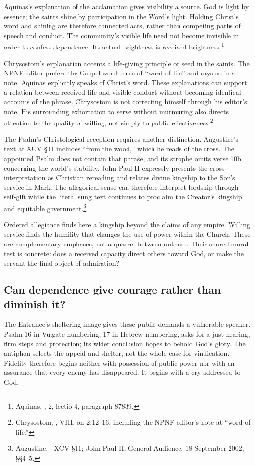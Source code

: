 Aquinas's explanation of the acclamation gives visibility a source. God is light by essence; the saints shine by participation in the Word's light. Holding Christ's word and shining are therefore connected acts, rather than competing paths of speech and conduct. The community's visible life need not become invisible in order to confess dependence. Its actual brightness is received brightness.\footnote{Aquinas, , 2, lectio 4, paragraph 87839.}

Chrysostom's explanation accents a life-giving principle or seed in the saints. The NPNF editor prefers the Gospel-word sense of ``word of life'' and says so in a note. Aquinas explicitly speaks of Christ's word. These explanations can support a relation between received life and visible conduct without becoming identical accounts of the phrase. Chrysostom is not correcting himself through his editor's note. His surrounding exhortation to serve without murmuring also directs attention to the quality of willing, not simply to public effectiveness.\footnote{Chrysostom, , VIII, on 2:12--16, including the NPNF editor's note at ``word of life.''}

The Psalm's Christological reception requires another distinction. Augustine's text at XCV §11 includes ``from the wood,'' which he reads of the cross. The appointed Psalm does not contain that phrase, and its strophe omits verse 10b concerning the world's stability. John Paul II expressly presents the cross interpretation as Christian rereading and relates divine kingship to the Son's service in Mark. The allegorical sense can therefore interpret lordship through self-gift while the literal sung text continues to proclaim the Creator's kingship and equitable government.\footnote{Augustine, , XCV §11; John Paul II, General Audience, 18 September 2002, §§4--5.}

Ordered allegiance finds here a kingship beyond the claims of any empire. Willing service finds the humility that changes the use of power within the Church. These are complementary emphases, not a quarrel between authors. Their shared moral test is concrete: does a received capacity direct others toward God, or make the servant the final object of admiration?

\subsection{Can dependence give courage rather than diminish it?}
The Entrance's sheltering image gives these public demands a vulnerable speaker. Psalm 16 in Vulgate numbering, 17 in Hebrew numbering, asks for a just hearing, firm steps and protection; its wider conclusion hopes to behold God's glory. The antiphon selects the appeal and shelter, not the whole case for vindication. Fidelity therefore begins neither with possession of public power nor with an assurance that every enemy has disappeared. It begins with a cry addressed to God.

